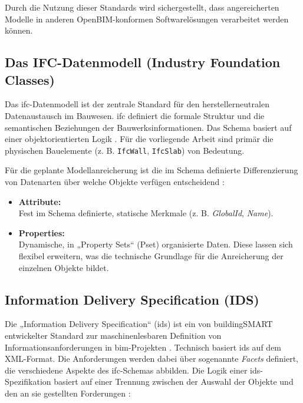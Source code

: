 Durch die Nutzung dieser Standards wird sichergestellt, dass angereicherten Modelle 
in anderen OpenBIM-konformen Softwarelösungen verarbeitet werden können.


\subsection{Das IFC-Datenmodell (Industry Foundation Classes)}
\label{subsec:ifc}

Das \gls{ifc}-Datenmodell ist der zentrale Standard für den herstellerneutralen Datenaustausch 
im Bauwesen. \gls{ifc} definiert die formale 
Struktur und die semantischen Beziehungen der Bauwerksinformationen.
Das Schema basiert auf einer objektorientierten Logik \cite{eichler2024bimcert}. 
Für die vorliegende Arbeit sind primär die physischen Bauelemente 
(z. B. \texttt{IfcWall}, \texttt{IfcSlab}) von Bedeutung.


Für die geplante Modellanreicherung ist die im Schema definierte Differenzierung von Datenarten über welche Objekte verfügen entscheidend  \cite{eichler2024bimcert}:
\begin{itemize}
\item \textbf{Attribute:} \\
Fest im Schema definierte, statische Merkmale (z. B. \textit{GlobalId}, \textit{Name}).
\item \textbf{Properties:} \\
Dynamische, in „Property Sets“ (Pset) organisierte Daten. Diese lassen sich 
flexibel erweitern, was die technische Grundlage für die Anreicherung der einzelnen 
Objekte bildet.
\end{itemize}

\subsection{Information Delivery Specification (IDS)}
\label{subsec:ids}

Die „Information Delivery Specification“ (\gls{ids}) ist ein von buildingSMART 
entwickelter Standard zur maschinenlesbaren Definition von Informationsanforderungen 
in \gls{bim}-Projekten \cite{eichler2024bimcert, buildingsmartIds}.
Technisch basiert \gls{ids} auf dem XML-Format. Die Anforderungen werden dabei über 
sogenannte \textit{Facets} definiert, die verschiedene Aspekte des \gls{ifc}-Schemas 
abbilden. Die Logik einer \gls{ids}-Spezifikation basiert auf einer Trennung zwischen der Auswahl 
der Objekte und den an sie gestellten Forderungen \cite{eichler2024bimcert}:

